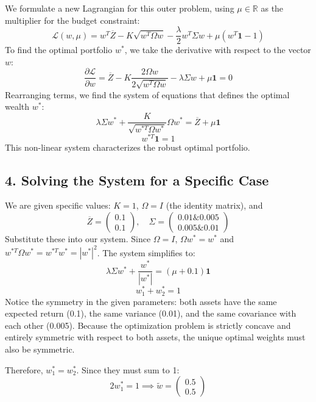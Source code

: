 We formulate a new Lagrangian for this outer problem, using $\mu \in \mathbb{R}$ as the multiplier for the budget constraint:
\[
\mathcal{L}(w, \mu) = w^T \overline{Z} - K\sqrt{w^T \Omega w} - \frac{\lambda}{2}w^T \Sigma w + \mu (w^T \mathbf{1} - 1)
\]
To find the optimal portfolio $w^*$, we take the derivative with respect to the vector $w$:
\[
\frac{\partial \mathcal{L}}{\partial w} = \overline{Z} - K \frac{2 \Omega w}{2\sqrt{w^T \Omega w}} - \lambda \Sigma w + \mu \mathbf{1} = 0
\]
Rearranging terms, we find the system of equations that defines the optimal wealth $w^*$:
\[
\lambda \Sigma w^* + \frac{K}{\sqrt{w^{*T} \Omega w^*}} \Omega w^* = \overline{Z} + \mu \mathbf{1}
\]
\[
w^{*T} \mathbf{1} = 1
\]
This non-linear system characterizes the robust optimal portfolio.

\subsection*{4. Solving the System for a Specific Case}
We are given specific values: $K=1$, $\Omega = I$ (the identity matrix), and 
\[
\overline{Z} = \begin{pmatrix} 0.1 \\ 0.1 \end{pmatrix}, \quad 
\Sigma = \begin{pmatrix} 0.01 \& 0.005 \\ 0.005 \& 0.01 \end{pmatrix}
\]
Substitute these into our system. Since $\Omega = I$, $\Omega w^* = w^*$ and $w^{*T} \Omega w^* = w^{*T} w^* = |w^*|^2$. The system simplifies to:
\[
\lambda \Sigma w^* + \frac{w^*}{|w^*|} = (\mu + 0.1)\mathbf{1}
\]
\[
w_1^* + w_2^* = 1
\]
Notice the symmetry in the given parameters: both assets have the same expected return (0.1), the same variance (0.01), and the same covariance with each other (0.005). Because the optimization problem is strictly concave and entirely symmetric with respect to both assets, the unique optimal weights must also be symmetric.

Therefore, $w_1^* = w_2^*$. Since they must sum to 1:
\[
2w_1^* = 1 \implies \tilde{w} = \begin{pmatrix} 0.5 \\ 0.5 \end{pmatrix}
\]